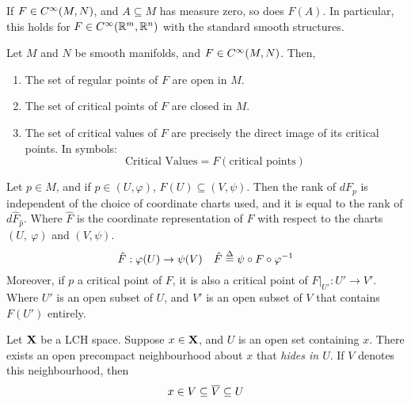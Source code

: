\documentclass[../main-manifolds.tex]{subfiles}
\begin{document}
\begin{wts}\label{lee-theorem6.9}
    If $F\in\cinf[M,N]$, and $A\subseteq M$ has measure zero, so does $F(A)$. In particular, this holds for $F\in\cinf[\realm,\realn]$ with the standard smooth structures.
\end{wts}


\begin{lemma}\label{lee-regular-critical-points}
    Let $M$ and $N$ be smooth manifolds, and $F\in\cinf[M,N]$. Then,
    \begin{enumerate}
        \item The set of regular points of $F$ are open in $M$.
        \item The set of critical points of $F$ are closed in $M$.
        \item The set of critical values of $F$ are precisely the direct image of its critical points. In symbols:
        \begin{equation}\label{lee-critical-values-image-of-critia-points}
            \text{Critical Values} = F(\text{critical points})
        \end{equation}
    \end{enumerate}
\end{lemma}
\begin{lemma}\label{lee-critical-points-local}
    Let $p\in M$, and if $p\in (U,\varphi)$, $F(U)\subseteq(V,\psi)$. Then the rank of $dF_p$ is independent of the choice of coordinate charts used, and it is equal to the rank of $d\hat{F}_{\hat{p}}$. Where $\hat{F}$ is the coordinate representation of $F$ with respect to the charts $(U,\: \varphi)$ and $(V,\psi)$.
        \[
            \hat{F}:\varphi(U)\to\psi(V)\quad \hat{F}\overset{\Delta}{=} \psi\circ F\circ \varphi^{-1}
        \]
    Moreover, if $p$ a critical point of $F$, it is also a critical point of $F|_{U'}:U'\to V'$. Where $U'$ is an open subset of $U$, and $V'$ is an open subset of $V$ that contains $F(U')$ entirely.
\end{lemma}
\begin{lemma}\label{lee-sards-LCH}
    Let ${\mathbf{X}}$ be a LCH space. Suppose $x\in {\mathbf{X}}$, and $U$ is an open set containing $x$. There exists an open precompact neighbourhood about $x$ that \emph{hides in $U$}. If $V$ denotes this neighbourhood, then
    \[
        x\in V\subseteq\overline{V}\subseteq U
    \]
\end{lemma}
\end{document}
